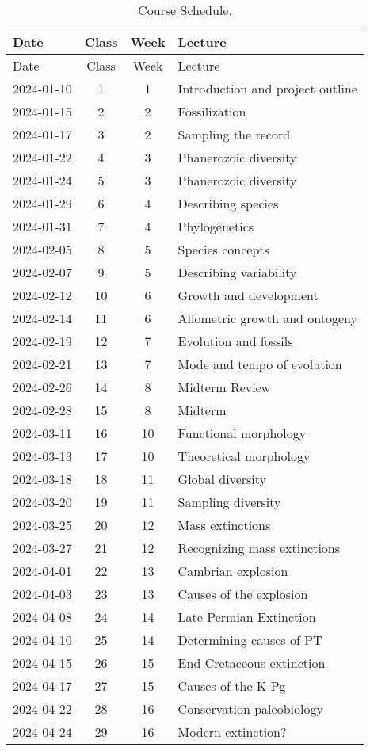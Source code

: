 \documentclass[11pt,]{article}
\begin{document}
\newpage

\begin{longtable}[]{@{}lccl@{}}
\caption{Course Schedule.}\tabularnewline
\toprule()
Date & Class & Week & Lecture \\
\midrule()
\endfirsthead
\toprule()
Date & Class & Week & Lecture \\
\midrule()
\endhead
2024-01-10 & 1 & 1 & Introduction and project outline \\
2024-01-15 & 2 & 2 & Fossilization \\
2024-01-17 & 3 & 2 & Sampling the record \\
2024-01-22 & 4 & 3 & Phanerozoic diversity \\
2024-01-24 & 5 & 3 & Phanerozoic diversity \\
2024-01-29 & 6 & 4 & Describing species \\
2024-01-31 & 7 & 4 & Phylogenetics \\
2024-02-05 & 8 & 5 & Species concepts \\
2024-02-07 & 9 & 5 & Describing variability \\
2024-02-12 & 10 & 6 & Growth and development \\
2024-02-14 & 11 & 6 & Allometric growth and ontogeny \\
2024-02-19 & 12 & 7 & Evolution and fossils \\
2024-02-21 & 13 & 7 & Mode and tempo of evolution \\
2024-02-26 & 14 & 8 & Midterm Review \\
2024-02-28 & 15 & 8 & Midterm \\
2024-03-11 & 16 & 10 & Functional morphology \\
2024-03-13 & 17 & 10 & Theoretical morphology \\
2024-03-18 & 18 & 11 & Global diversity \\
2024-03-20 & 19 & 11 & Sampling diversity \\
2024-03-25 & 20 & 12 & Mass extinctions \\
2024-03-27 & 21 & 12 & Recognizing mass extinctions \\
2024-04-01 & 22 & 13 & Cambrian explosion \\
2024-04-03 & 23 & 13 & Causes of the explosion \\
2024-04-08 & 24 & 14 & Late Permian Extinction \\
2024-04-10 & 25 & 14 & Determining causes of PT \\
2024-04-15 & 26 & 15 & End Cretaceous extinction \\
2024-04-17 & 27 & 15 & Causes of the K-Pg \\
2024-04-22 & 28 & 16 & Conservation paleobiology \\
2024-04-24 & 29 & 16 & Modern extinction? \\
\bottomrule()
\end{longtable}
\end{document}
